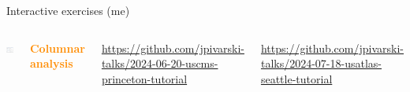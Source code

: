 \documentclass[aspectratio=169]{beamer}
\begin{document}
\begin{frame}{Interactive exercises (me)}
\vspace{0.25 cm}
\large
\begin{columns}
\includegraphics[width=\linewidth]{PLOTS/teacher-student-notebook-pair.png}

\textcolor{darkorange}{\bf Columnar analysis}

\tiny
\vspace{0.2 cm}
\textcolor{blue}{\href{https://github.com/jpivarski-talks/2024-06-20-uscms-princeton-tutorial}{https://github.com/jpivarski-talks/2024-06-20-uscms-princeton-tutorial}}

\textcolor{blue}{\href{https://github.com/jpivarski-talks/2024-07-18-usatlas-seattle-tutorial}{https://github.com/jpivarski-talks/2024-07-18-usatlas-seattle-tutorial}}

\small
\vspace{0.2 cm}

\vspace{0.2 cm}

\vspace{0.2 cm}

\vspace{0.2 cm}
\end{columns}
\end{frame}
\end{document}
